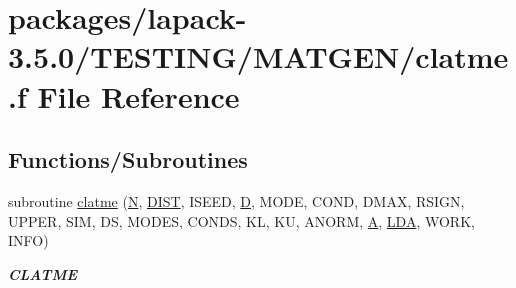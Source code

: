 \hypertarget{clatme_8f}{}\section{packages/lapack-\/3.5.0/\+T\+E\+S\+T\+I\+N\+G/\+M\+A\+T\+G\+E\+N/clatme.f File Reference}
\label{clatme_8f}
\subsection*{Functions/\+Subroutines}
\begin{DoxyCompactItemize}
\item 
subroutine \hyperlink{group__complex__matgen_ga6b623095dea5337d8a8cc4e32c7990e0}{clatme} (\hyperlink{polmisc_8c_a0240ac851181b84ac374872dc5434ee4}{N}, \hyperlink{superlu__enum__consts_8h_af00a42ecad444bbda75cde1b64bd7e72ac04fbbdf0d80a4ad25e565541deeebd7}{D\+I\+S\+T}, I\+S\+E\+E\+D, \hyperlink{odrpack_8h_a7dae6ea403d00f3687f24a874e67d139}{D}, M\+O\+D\+E, C\+O\+N\+D, D\+M\+A\+X, R\+S\+I\+G\+N, U\+P\+P\+E\+R, S\+I\+M, D\+S, M\+O\+D\+E\+S, C\+O\+N\+D\+S, K\+L, K\+U, A\+N\+O\+R\+M, \hyperlink{classA}{A}, \hyperlink{example__user_8c_ae946da542ce0db94dced19b2ecefd1aa}{L\+D\+A}, W\+O\+R\+K, I\+N\+F\+O)
\begin{DoxyCompactList}\small\item\em {\bfseries C\+L\+A\+T\+M\+E} \end{DoxyCompactList}\end{DoxyCompactItemize}
